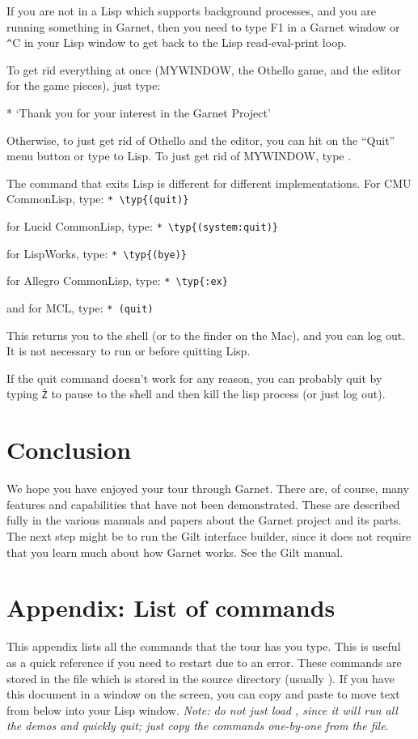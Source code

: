 If you are not in a Lisp which supports background processes, and
you are running something in Garnet, then you need to type F1 in a
Garnet window or {\texttt \^}C in your Lisp window to get back to the Lisp
read-eval-print loop.

To get rid everything at once (MYWINDOW, the Othello game, and the
editor for the game pieces), just type:
\begin{programexample}
* 
`Thank you for your interest in the Garnet Project'
\end{programexample}

Otherwise,
to just get rid of Othello and the editor, you can hit on the ``Quit'' menu
button or type  to Lisp.  To just get rid of MYWINDOW,
type .

The command that exits Lisp is different for different implementations.
For CMU CommonLisp, type: \verb+* \typ{(quit)}+

for Lucid CommonLisp, type: \verb+* \typ{(system:quit)}+

for LispWorks, type: \verb+* \typ{(bye)}+

for Allegro CommonLisp, type: \verb+* \typ{:ex}+

and for MCL, type: \verb+* (quit)+

This returns you to the shell (or to the finder on the Mac), and you
can log out.  It is not necessary to run  or
 before quitting Lisp.

If the quit command doesn't work for any reason,
you can probably quit by typing \texttt{\^Z} to pause to the shell and
then kill the lisp process (or just log out).

\chapter{Conclusion}
We hope you have enjoyed your tour through Garnet.  There are, of course,
many features and capabilities that have not been demonstrated.  These are
described fully in the various manuals and papers about the Garnet project
and its parts.  The next step might be to run the Gilt interface
builder, since it does not require that you learn much about how
Garnet works.  See the Gilt manual.

\chapter*{Appendix: List of commands}
This appendix lists all the commands that the tour has you type.  This is
useful as a quick reference if you need to restart due to an error.
These commands are stored in
the file  which is stored in the  source
directory (usually ).
If you have this document in a window on the screen, you can
copy 
and 
paste to move text from below into your Lisp window.
{\it Note: do
not just load , since it will run all the demos and quickly
quit; just copy the commands one-by-one from the file}.

